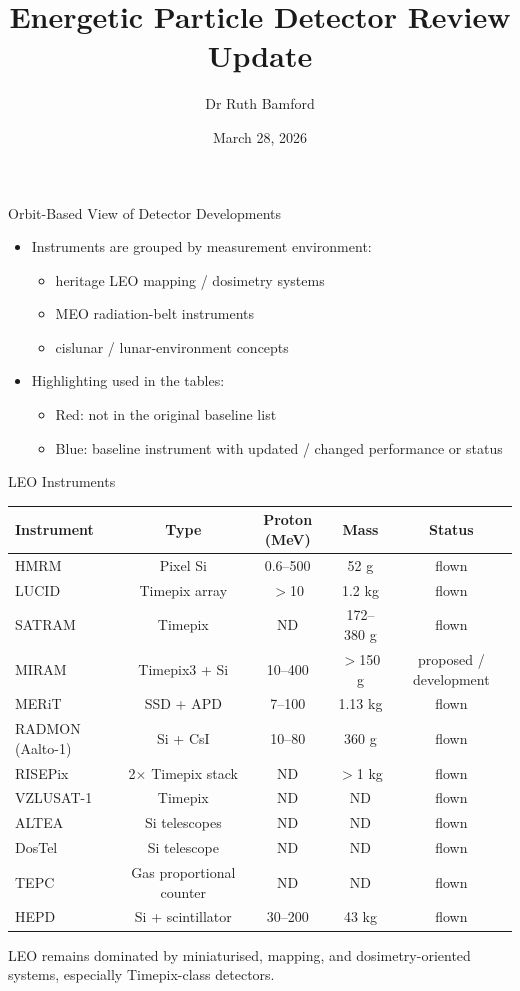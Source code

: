 \documentclass[aspectratio=169]{beamer}
\title{Energetic Particle Detector Review Update}
\author{Dr Ruth Bamford}
\institute{RAL Space}
\date{March 28, 2026}
\newcommand{\newi}[1]{\textcolor{newinst}{#1}}
\newcommand{\updi}[1]{\textcolor{updatedinst}{#1}}
\begin{document}
\frame{\titlepage}

\begin{frame}{Orbit-Based View of Detector Developments}
\begin{itemize}
\item Instruments are grouped by measurement environment:
\begin{itemize}
    \item heritage LEO mapping / dosimetry systems
    \item MEO radiation-belt instruments
    \item cislunar / lunar-environment concepts
\end{itemize}
\item Highlighting used in the tables:
\begin{itemize}
    \item \textcolor{newinst}{Red}: not in the original baseline list
    \item \textcolor{updatedinst}{Blue}: baseline instrument with updated / changed performance or status
\end{itemize}
\end{itemize}
\end{frame}

\begin{frame}{LEO Instruments}
\scriptsize
\begin{tabular}{lcccc}
\toprule
Instrument & Type & Proton (MeV) & Mass & Status \\
\midrule
HMRM & Pixel Si & 0.6--500 & 52 g & flown \\
LUCID & Timepix array & $>$10 & 1.2 kg & flown \\
SATRAM & Timepix & ND & 172--380 g & flown \\
\updi{MIRAM} & Timepix3 + Si & 10--400 & $>$150 g & proposed / development \\
MERiT & SSD + APD & 7--100 & 1.13 kg & flown \\
\newi{RADMON (Aalto-1)} & Si + CsI & 10--80 & 360 g & flown \\
RISEPix & 2$\times$ Timepix stack & ND & $>$1 kg & flown \\
VZLUSAT-1 & Timepix & ND & ND & flown \\
\newi{ALTEA} & Si telescopes & ND & ND & flown \\
\newi{DosTel} & Si telescope & ND & ND & flown \\
TEPC & Gas proportional counter & ND & ND & flown \\
\newi{HEPD} & Si + scintillator & 30--200 & 43 kg & flown \\
\bottomrule
\end{tabular}

\vspace{0.3cm}
\footnotesize
LEO remains dominated by miniaturised, mapping, and dosimetry-oriented systems, especially Timepix-class detectors.
\end{frame}
\end{document}
